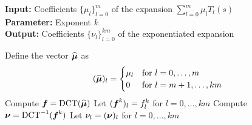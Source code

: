 \hspace*{\algorithmicindent} \textbf{Input:} Coefficients $\{ \mu_l \}_{l=0}^m$ of the expansion $\sum_{l=0}^m \mu_l T_l(s)$ \\
\hspace*{\algorithmicindent} \textbf{Parameter:} Exponent $k$ \\
\hspace*{\algorithmicindent} \textbf{Output:} Coefficients $\{ \nu_l \}_{l=0}^{km}$ of the exponentiated expansion
\begin{algorithmic}[1]
    \State Define the vector $\widehat{\boldsymbol{\mu}}$ as
        \begin{equation}
            (\widehat{\boldsymbol{\mu}})_l = \begin{cases} \mu_l &\text{for $l=0, \dots, m$} \\
                                                     0 &\text{for $l=m+1, \dots, km$} \end{cases}
        \end{equation}
    \State Compute $\boldsymbol{f} = \operatorname{DCT}(\widehat{\boldsymbol{\mu}})$
    \State Let $(\boldsymbol{f}^{k})_l = f_l^k$ for $l=0, \dots, km$
    \State Compute $\boldsymbol{\nu} = \operatorname{DCT}^{-1}(\boldsymbol{f}^{k})$
    \State Let $\nu_l = (\boldsymbol{\nu})_l$ for $l=0, \dots, km$
\end{algorithmic}
